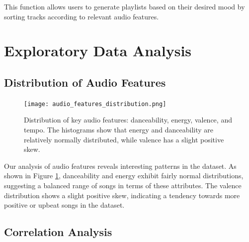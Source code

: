 \documentclass[runningheads]{llncs}
\begin{document}
This function allows users to generate playlists based on their desired mood by sorting tracks according to relevant audio features.

\section{Exploratory Data Analysis}

\subsection{Distribution of Audio Features}

\begin{figure}[h]
\centering
\texttt{[image: audio\_features\_distribution.png]}
\caption{Distribution of key audio features: danceability, energy, valence, and tempo. The histograms show that energy and danceability are relatively normally distributed, while valence has a slight positive skew.}
\label{fig:audio_features}
\end{figure}

Our analysis of audio features reveals interesting patterns in the dataset. As shown in Figure \ref{fig:audio_features}, danceability and energy exhibit fairly normal distributions, suggesting a balanced range of songs in terms of these attributes. The valence distribution shows a slight positive skew, indicating a tendency towards more positive or upbeat songs in the dataset.

\subsection{Correlation Analysis}
\end{document}
